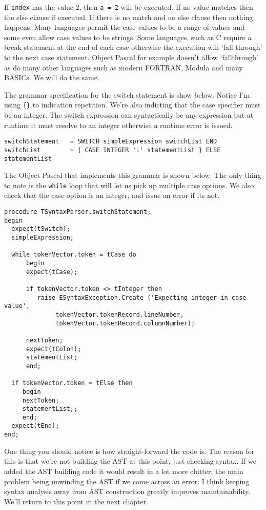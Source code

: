 If {\tt index} has the value 2, then {\tt a = 2} will be executed. If no value matches then the else clause if executed. If there is no match and no else clause then nothing happens. Many languages permit the case values to be a range of values and some even allow case values to be strings. Some languages, such as C require a break statement at the end of each case otherwise the execution will `fall through' to the next case statement. Object Pascal for example doesn't allow `fallthrough' as do many other languages such as modern FORTRAN, Modula and many BASICs. We will do the same.

The grammar specification for the switch statement is show below. Notice I'm using \verb|{}| to indication repetition. We're also indicting that the case specifier must be an integer. The switch expression can syntactically be any expression but at runtime it must resolve to an integer otherwise a runtime error is issued.

\begin{lstlisting}
switchStatement   = SWITCH simpleExpression switchList END
switchList        = { CASE INTEGER ':' statementList } ELSE statementList
\end{lstlisting}

The Object Pascal that implements this grammar is shown below. The only thing to note is the {\tt while} loop that will let us pick up multiple case options. We also check that the case option is an integer, and issue an error if its not.

\begin{lstlisting}
procedure TSyntaxParser.switchStatement;
begin
  expect(tSwitch);
  simpleExpression;

  while tokenVector.token = tCase do
      begin
      expect(tCase);

      if tokenVector.token <> tInteger then
         raise ESyntaxException.Create ('Expecting integer in case value',
              tokenVector.tokenRecord.lineNumber,
              tokenVector.tokenRecord.columnNumber);

      nextToken;
      expect(tColon);
      statementList;
      end;

  if tokenVector.token = tElse then
     begin
     nextToken;
     statementList;;
     end;
  expect(tEnd);
end;
\end{lstlisting}

One thing you should notice is how straight-forward the code is. The reason for this is that we're not building the AST at this point, just checking syntax. If we added the AST building code it would result in a lot more clutter; the main problem being unwinding the AST if we come across an error. I think keeping syntax analysis away from AST construction greatly improves maintainability. We'll return to this point in the next chapter.

